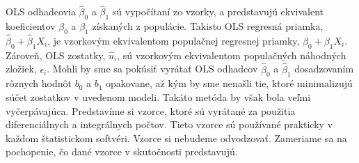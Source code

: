 \documentclass[]{tukediphc}
\begin{document}
OLS odhadcovia $\hat\beta_0$ a $\hat\beta_1$ sú vypočítaní zo vzorky, a predstavujú ekvivalent koeficientov $\beta_0$ a $\beta_1$ získaných z populácie. Takisto OLS regresná priamka, $\hat\beta_0 + \hat\beta_{1}X_i$, je vzorkovým ekvivalentom populačnej regresnej priamky, $\beta_0 + \beta_{1}X_i$. Zároveň, OLS zostatky, $\hat{u}_i$, sú vzorkovým ekvivalentom populačných náhodných zložiek, $\epsilon_i$. Mohli by sme sa pokúsiť vyrátať OLS odhadcov $\hat\beta_0$ a $\hat\beta_1$ dosadzovaním rôznych hodnôt $b_0$ a $b_1$ opakovane, až kým by sme nenašli tie, ktoré minimalizujú súčet zostatkov v uvedenom modeli. Takáto metóda by však bola veľmi vyčerpávajúca. Predstavíme si vzorce, ktoré sú vyrátané za použitia diferenciálnych a integrálnych počtov. Tieto vzorce sú používané prakticky v každom štatistickom softvéri. Vzorce si nebudeme odvodzovať. Zameriame sa na pochopenie, čo dané vzorce v skutočnosti predstavujú. 




%

%

%

%

%

%

%
\newpage
{}
\protect\label{page:posledna}
\end{document}
